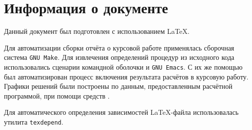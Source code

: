 \documentclass{article}
\numberwithin{equation}{section}
\begin{document}


\clearpage
\part{Информация о документе}

Данный документ был подготовлен с использованием \LaTeX{}.

Для автоматизации сборки отчёта о курсовой работе применялась
сборочная система \texttt{GNU Make}. Для извлечения определений
процедур из исходного кода использовались сценарии командной оболочки
и \texttt{GNU Emacs}. С их же помощью был автоматизирован процесс
включения результата расчётов в курсовую работу. Графики решений были
построены по данным, предоставленным расчётной программой, при помощи
средств \MP.

Для автоматического определения зависимостей
\LaTeX{}-файла использовалась утилита \texttt{texdepend}.



\end{document}
